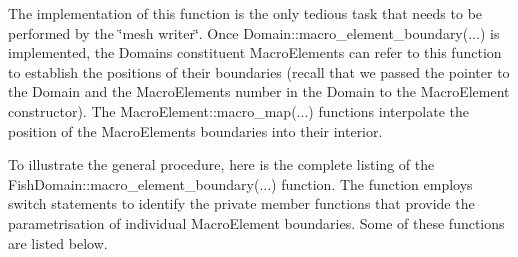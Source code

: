 The implementation of this function is the only tedious task that needs to be performed by the \char`\"{}mesh writer\char`\"{}. Once {\ttfamily Domain\+::macro\+\_\+element\+\_\+boundary}(...) is implemented, the {\ttfamily Domain\textquotesingle{}s} constituent {\ttfamily Macro\+Elements} can refer to this function to establish the positions of their boundaries (recall that we passed the pointer to the {\ttfamily Domain} and the {\ttfamily Macro\+Element\textquotesingle{}s} number in the {\ttfamily Domain} to the {\ttfamily Macro\+Element} constructor). The {\ttfamily Macro\+Element\+::macro\+\_\+map}(...) functions interpolate the position of the {\ttfamily Macro\+Element\textquotesingle{}s} boundaries into their interior.

To illustrate the general procedure, here is the complete listing of the {\ttfamily Fish\+Domain\+::macro\+\_\+element\+\_\+boundary}(...) function. The function employs switch statements to identify the private member functions that provide the parametrisation of individual {\ttfamily Macro\+Element} boundaries. Some of these functions are listed below.

